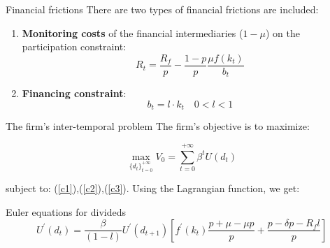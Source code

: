 \documentclass{beamer}
\begin{document}
\begin{frame}{Financial frictions}
    There are two types of financial frictions are included:
    \begin{enumerate}
        \item \textbf{Monitoring costs} of the financial intermediaries (\(1-\mu\)) on the participation constraint:
            \begin{equation}
                R_t=\frac{R_f}{p}  -\frac{ 1-p }{ p }\frac{\mu f{(k_{t})}}{b_t} \label{c2}
        \end{equation}
        \item \textbf{Financing constraint}:
        \begin{equation}
            b_t = l \cdot k_t \quad 0<l<1 \label{c3}
        \end{equation}
    \end{enumerate}
\end{frame}
\begin{frame}{The firm's inter-temporal problem}
     The firm's objective is to maximize:

\[
\max_{{\{d_{t}\}}_{t=0}^{+\infty}}V_0 = \sum_{t=0}^{+\infty}{\beta^t U(d_t)}
\]

subject to: (\ref{c1}),(\ref{c2}),(\ref{c3}).
Using the Lagrangian function, we get:
\begin{block}{Euler equations for divideds}
    \begin{equation}
        U^{\prime}{(d_{t})}=\frac{\beta}{\left(1-l\right)} U^{\prime}{(d_{t+1})}\left[ f^{\prime}{(k_{t})}\frac{p + \mu - \mu p}{p} + \frac{p - \delta p - R_f l}{p} \right]
    \end{equation}
\end{block}
\end{frame}
\end{document}
